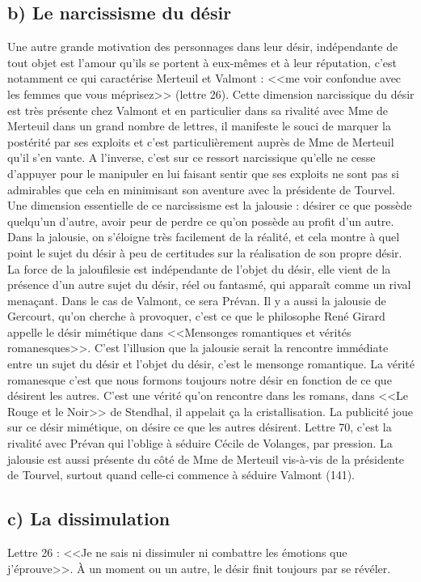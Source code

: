 \documentclass[12pt]{article}
\begin{document}
\subsection*{b) Le narcissisme du désir}
Une autre grande motivation des personnages dans leur désir, indépendante de tout objet est l'amour qu'ils se portent à eux-mêmes et à leur réputation, c'est notamment ce qui caractérise Merteuil et Valmont : <<me voir confondue avec les femmes que vous méprisez>> (lettre 26).
Cette dimension narcissique du désir est très présente chez Valmont et en particulier dans sa rivalité avec Mme de Merteuil dans un grand nombre de lettres, il manifeste le souci de marquer la postérité par ses exploits et c'est particulièrement auprès de Mme de Merteuil qu'il s'en vante.
A l'inverse, c'est sur ce ressort narcissique qu'elle ne cesse d'appuyer pour le manipuler en lui faisant sentir que ses exploits ne sont pas si admirables que cela en minimisant son aventure avec la présidente de Tourvel.
Une dimension essentielle de ce narcissisme est la jalousie : désirer ce que possède quelqu'un d'autre, avoir peur de perdre ce qu'on possède au profit d'un autre.
Dans la jalousie, on s'éloigne très facilement de la réalité, et cela montre à quel point le sujet du désir à peu de certitudes sur la réalisation de son propre désir.
La force de la jaloufilesie est indépendante de l'objet du désir, elle vient de la présence d'un autre sujet du désir, réel ou fantasmé, qui apparaît comme un rival menaçant.
Dans le cas de Valmont, ce sera Prévan. Il y a aussi la jalousie de Gercourt, qu'on cherche à provoquer, c'est ce que le philosophe René Girard appelle le désir mimétique dans <<Mensonges romantiques et vérités romanesques>>.
C'est l'illusion que la jalousie serait la rencontre immédiate entre un sujet du désir et l'objet du désir, c'est le mensonge romantique.
La vérité romanesque c'est que nous formons toujours notre désir en fonction de ce que désirent les autres.
C'est une vérité qu'on rencontre dans les romans, dans <<Le Rouge et le Noir>> de Stendhal, il appelait ça la cristallisation.
La publicité joue sur ce désir mimétique, on désire ce que les autres désirent.
Lettre 70, c'est la rivalité avec Prévan qui l'oblige à séduire Cécile de Volanges, par pression.
La jalousie est aussi présente du côté de Mme de Merteuil vis-à-vis de la présidente de Tourvel, surtout quand celle-ci commence à séduire Valmont (141).
\subsection*{c) La dissimulation}
Lettre 26 : <<Je ne sais ni dissimuler ni combattre les émotions que j'éprouve>>.
À un moment ou un autre, le désir finit toujours par se révéler.
\end{document}
